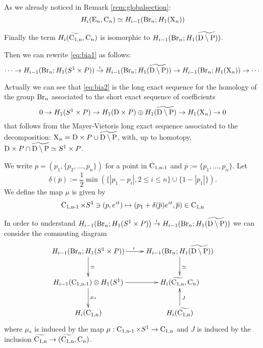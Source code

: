 As we already noticed in Remark \ref{rem:globalsection}:
$$
H_i (\mathrm{E}_n, \operatorname{C}_n) \simeq H_{i-1}(\operatorname{Br}_n; H_1(\mathrm{X}_n))
$$

Finally the term $ H_i(\widetilde{\operatorname{C_{1,n}}}, \operatorname{C}_n)$ is isomorphic to $H_{i-1}(\operatorname{Br}_n; H_1(\widetilde{\mathrm{D} \setminus \mathrm{P}}))$.

Then we can rewrite \eqref{eq:bia1} as follows:
\begin{equation}\label{eq:bia2}
\cdots \to H_{i-1}(\operatorname{Br}_n; H_1(S^1 \times P)) \stackrel{\iota}{\to} H_{i-1}(\operatorname{Br}_n; H_1(\widetilde{\mathrm{D} \setminus \mathrm{P}})) \to  H_{i-1}(\operatorname{Br}_n; H_1(\mathrm{X}_n)) \to \cdots
\end{equation}

Actually we can see that \eqref{eq:bia2} is the long exact sequence for the homology of the group $\operatorname{Br}_n$ associated to the short exact sequence of coefficients
$$
0 \to H_1(S^1 \times P) \to H_1(\mathrm{D} \times P) \oplus H_1(\widetilde{\mathrm{D} \setminus \mathrm{P}}) \to H_1(\mathrm{X}_n) \to 0
$$
that follows from the Mayer-Vietoris long exact sequence associated to the decomposition: $\mathrm{X}_n = \mathrm{D} \times P \cup \widetilde{\mathrm{D} \setminus \mathrm{P}}$, with, up to homotopy, $\mathrm{D} \times P \cap \widetilde{\mathrm{D} \setminus \mathrm{P}} \simeq S^1 \times P$.

\begin{df} \label{df:mu}
We write $p= (p_1, \{p_2, \ldots, p_n\})$ for a point in $\operatorname{C_{1,n-1}}$ and   $\overline{p} := \{p_1, \ldots, p_n\}$. Let $$\delta(\overline{p}):= \frac{1}{2}\min \left( \{ |p_1 - p_i|,  2 \leq i  \leq n\} \cup \{ 1-|p_1|\}
\right).$$
We define the map $\mu$ is given  by 
$$
\operatorname{C_{1,n-1}} \times S^1 \ni (p,e^{it}) \mapsto (p_1 + \delta(\overline{p})e^{it}, \overline{p}) \in \operatorname{C_{1,n}}
$$
\end{df}


In order to understand $H_{i-1}(\operatorname{Br}_n; H_1(S^1 \times P)) \stackrel{\iota}{\to} H_{i-1}(\operatorname{Br}_n; H_1(\widetilde{\mathrm{D} \setminus \mathrm{P}}))$ we can consider the commuting diagram
\begin{equation}\label{diag:trerighe0}
\begin{tabular}{c}
\xymatrix @R=2pc @C=2pc {
H_{i-1}(\Br_n; H_1(S^1 \times P)) \ar[r]^\iota \ar[d]^\simeq & H_{i-1}(\Br_n; H_1(\ddiskP))\ar[d]^\simeq  \\
H_{i-1}(\confm{n-1}) \otimes H_1(S^1) \ar[d]^{\mu_*} \ar[r] & H_i(\confmd{n}, \conf_n) \\
H_i(\confm{n}) 
&H_i(\confmd{n})  \ar[u]_J
}
\end{tabular}
\end{equation}
where $\mu_*$ is induced by the map $\mu: \operatorname{C_{1,n-1}} \times S^1 \to \operatorname{C_{1,n}}$
and $J$ is induced by the inclusion $\widetilde{\operatorname{C_{1,n}}} \to (\widetilde{\operatorname{C_{1,n}}}, \operatorname{C}_n)$.

